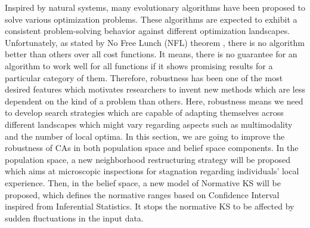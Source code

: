 \label{chapter:Exp}
Inspired by natural systems, many evolutionary algorithms have been proposed to solve various optimization problems. These algorithms are expected to exhibit a consistent problem-solving behavior against different optimization landscapes. Unfortunately, as stated by No Free Lunch (NFL) theorem \cite{wolpert1997no}, there is no algorithm better than others over all cost functions. It means, there is no guarantee for an algorithm to work well for all functions if it shows promising results for a particular category of them. Therefore, robustness has been one of the most desired features which motivates researchers to invent new methods which are less dependent on the kind of a problem than others. Here, robustness means we need to develop search strategies which are capable of adapting themselves across different landscapes which might vary regarding aspects such as multimodality and the number of local optima. 
\newline
In this section, we are going to improve the robustness of CAs in both population space and belief space components. In the population space, a new neighborhood restructuring strategy will be proposed which aims at microscopic inspections for stagnation regarding individuals' local experience. Then, in the belief space, a new model of Normative KS will be proposed, which defines the normative ranges based on Confidence Interval inspired from Inferential Statistics. It stops the normative KS to be affected by sudden fluctuations in the input data.

